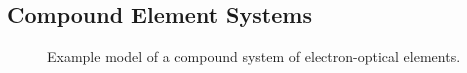 
\subsection{Compound Element Systems} \label{sec:compound}

\begin{figure}
  \centering
  \begin{tikzpicture}
    
  \end{tikzpicture}
  \caption[Example model of a compound system of electron-optical elements]{
    Example model of a compound system of electron-optical elements.
  }
  \label{fig:compound}
\end{figure}

